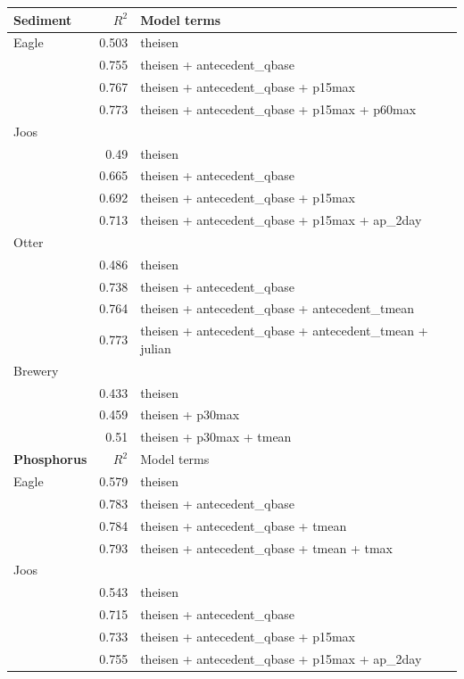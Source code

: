 \documentclass[12pt]{article}
\begin{document}
\begin{table}[h]
    \begin{center}
    \begin{tabular}{lrl}
    \textbf{Sediment} & $R^2$ & Model terms \\
    \hline
    Eagle & 0.503 & theisen\\
    & 0.755 & theisen + antecedent\_qbase\\
    & 0.767 & theisen + antecedent\_qbase + p15max\\
    & 0.773 & theisen + antecedent\_qbase + p15max + p60max\\
    
    Joos & & \\
    & 0.49 & theisen\\
    & 0.665 & theisen + antecedent\_qbase\\
    & 0.692 & theisen + antecedent\_qbase + p15max\\
    & 0.713 & theisen + antecedent\_qbase + p15max + ap\_2day\\

    Otter & & \\
    & 0.486 & theisen\\
    & 0.738 & theisen + antecedent\_qbase\\
    & 0.764 & theisen + antecedent\_qbase + antecedent\_tmean\\
    & 0.773 & theisen + antecedent\_qbase + antecedent\_tmean + julian\\

    Brewery & & \\
    & 0.433 & theisen\\
    & 0.459 & theisen + p30max\\
    & 0.51 & theisen + p30max + tmean
    \vspace{6mm}\\

    \textbf{Phosphorus} & $R^2$ & Model terms \\
    \hline
    Eagle & 0.579 & theisen\\
    & 0.783 & theisen + antecedent\_qbase\\
    & 0.784 & theisen + antecedent\_qbase + tmean\\
    & 0.793 & theisen + antecedent\_qbase + tmean + tmax\\
    
    Joos & & \\
    & 0.543 & theisen\\
    & 0.715 & theisen + antecedent\_qbase\\
    & 0.733 & theisen + antecedent\_qbase + p15max\\
    & 0.755 & theisen + antecedent\_qbase + p15max + ap\_2day\\


\end{tabular}
\end{center}
\end{table}
\end{document}
